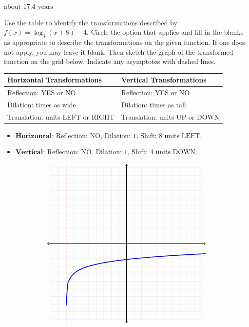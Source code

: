 \documentclass[addpoints]{exam}
\begin{document}
\begin{questions}
\begin{solution}
\(\boxed{\text{about } 17.4 \text{ years}}\)
\end{solution}
\answerline
\newpage

\question[5] Use the table to identify the transformations described by \(\displaystyle{ f(x) = \log_{3}(x + 8) - 4 }\). Circle the option that applies and fill in the blanks as appropriate to describe the transformations on the given function. If one does not apply, you may leave it blank. Then sketch the graph of the transformed function on the grid below. Indicate any asymptotes with dashed lines.\\
\begin{table}[h]
    \renewcommand{\arraystretch}{3} 
    \centering
    \begin{tabular}{|l|l|}
        \hline
        \textbf{Horizontal Transformations} & \textbf{Vertical Transformations} \\ \hline
        Reflection: YES or NO & Reflection: YES or NO \\ \hline
        Dilation: \underline{\hspace{2cm}} times as wide & Dilation: \underline{\hspace{2cm}} times as tall \\ \hline
        Translation: \underline{\hspace{2cm}} units LEFT or RIGHT & Translation: \underline{\hspace{2cm}} units UP or DOWN \\ \hline
    \end{tabular}
\end{table}
\begin{solution}
\begin{itemize}
\item
 \(\textbf{Horizontal: } \text{Reflection: NO, Dilation: 1, Shift: 8 units LEFT.}\) 

\item
 \(\textbf{Vertical: } \text{Reflection: NO, Dilation: 1, Shift: 4 units DOWN.}\) 

\end{itemize}


 \[\begin{tikzpicture}[scale=0.39] \draw[step=1cm, gray!40, very thin] (-10,-10) grid (10,10); \draw[thick, <->] (-10.5,0) -- (10.5,0); \draw[thick, <->] (0,-10.5) -- (0,10.5); \clip (-10.5,-10.5) rectangle (10.5,10.5);\draw[dashed, red, thick] (-8, -10.5) -- (-8, 10.5);\draw[blue, very thick, samples=100, domain=-7.99000000000000:10.5000000000000, smooth] plot (\x, {(ln(\x - (-8))/ln(3)) + (-4)});\end{tikzpicture}\]
\end{solution}


\end{questions}
\end{document}
